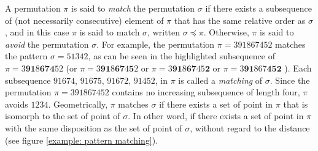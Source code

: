 \documentclass[a4paper]{llncs}
\begin{document}
A permutation $\pi$ is said to \emph{match} the permutation $\sigma$
if there exists a subsequence of (not necessarily consecutive)
element of $\pi$ that has the same relative order as $\sigma$,
and in this case $\pi$ is said to match $\sigma$, 
written $\sigma \preceq \pi$.
Otherwise, $\pi$ is said to \emph{avoid} the permutation $\sigma$.
For example, the permutation $\pi = 391867452$
matches the pattern $\sigma = 51342$,
as can be seen in the highlighted subsequence of
$\pi = 3\mathbf{9}\mathbf{1}8\mathbf{6}\mathbf{7}\mathbf{4}52$
(or
$\pi = 3\mathbf{9}\mathbf{1}8\mathbf{6}\mathbf{7}4\mathbf{5}2$
or
$\pi = 3\mathbf{9}\mathbf{1}8\mathbf{6}\mathbf{7}45\textbf{2}$
or
$\pi = 3\mathbf{9}\mathbf{1}867\textbf{4}\textbf{5}\mathbf{2}$
).
Each subsequence $91674$,
$91675$,
$91672$,
$91452$,
 in $\pi$ is called a
\emph{matching}
of $\sigma$.
Since the permutation $\pi = 391867452$  contains no increasing subsequence of
length four, $\pi$ avoids $1234$.
Geometrically, $\pi$ matches $\sigma$ if there exists
a set of point in $\pi$ that is isomorph to the set of point of $\sigma$. In other word,
if there exists a set of point in $\pi$ with the same disposition as the set of point of $\sigma$, without regard to the distance (see figure \ref{example: pattern matching}).
\end{document}
